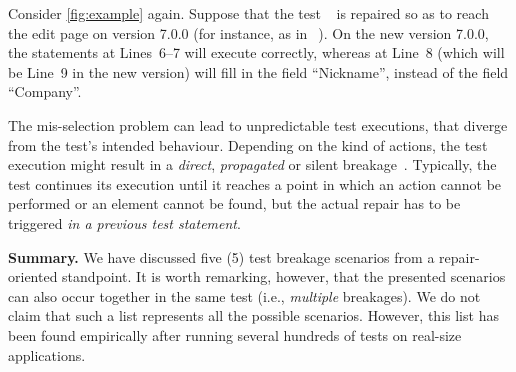 Consider \autoref{fig:example} again. 
Suppose that the test~\textcircled{} is repaired so as to reach the edit page on version 7.0.0 (for instance, as in~\textcircled{}). On the new version 7.0.0, the statements at Lines~6--7 will execute correctly, whereas at Line~8 (which will be Line~9 in the new version) will fill in the field ``Nickname'', instead of the field ``Company''.

The mis-selection problem can lead to unpredictable test executions, that diverge from the test's intended behaviour. Depending on the kind of actions, the test execution might result in a \textit{direct}, \textit{propagated} or silent breakage~\cite{Hammoudi-2016-ICST}. Typically, the test continues its execution until it reaches a point in which an action cannot be performed or an element cannot be found, but the actual repair has to be triggered \textit{in a previous test statement}.


\noindent
\textbf{Summary.}
We have discussed five (5) test breakage scenarios from a repair-oriented standpoint. It is worth remarking, however, that the presented scenarios can also occur together in the same test (i.e., \textit{multiple} breakages). We do not claim that such a list represents all the possible scenarios. However, this list has been found empirically after running several hundreds of tests on real-size applications. 

